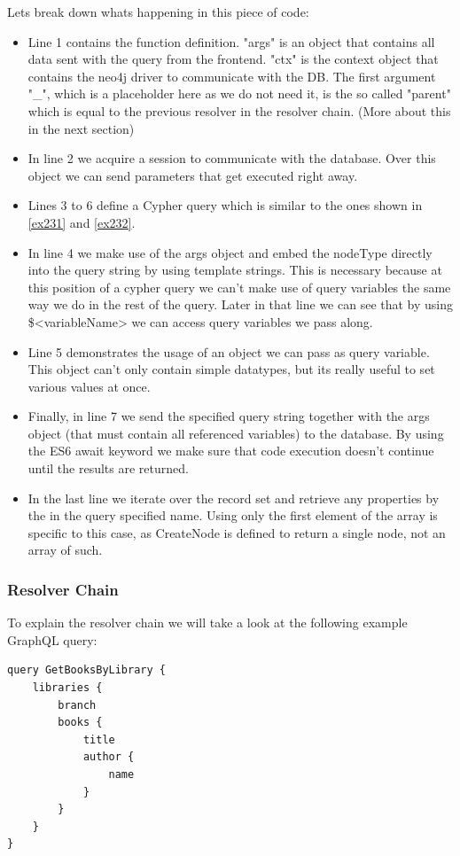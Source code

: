 Lets break down whats happening in this piece of code:
\begin{itemize}
\item Line 1 contains the function definition. "args" is an object that contains all data sent with the query from the frontend. "ctx" is the context object that contains the neo4j driver to communicate with the DB. The first argument "\_", which is a placeholder here as we do not need it, is the so called "parent" which is equal to the previous resolver in the resolver chain. (More about this in the next section)
\item In line 2 we acquire a session to communicate with the database. \cite{Neo4jDriver} Over this object we can send parameters that get executed right away.
\item Lines 3 to 6 define a Cypher query which is similar to the ones shown in \autoref{ex231} and \autoref{ex232}. 
\item In line 4 we make use of the args object and embed the nodeType directly into the query string by using template strings. This is necessary because at this position of a cypher query we can't make use of query variables the same way we do in the rest of the query. Later in that line we can see that by using \$<variableName> we can access query variables we pass along.
\item Line 5 demonstrates the usage of an object we can pass as query variable. This object can't only contain simple datatypes, but its really useful to set various values at once.
\item Finally, in line 7 we send the specified query string together with the args object (that must contain all referenced variables) to the database. By using the ES6 await keyword we make sure that code execution doesn't continue until the results are returned.
\item In the last line we iterate over the record set and retrieve any properties by the in the query specified name. Using only the first element of the array is specific to this case, as CreateNode is defined to return a single node, not an array of such.
\end{itemize}

\subsubsection{Resolver Chain}
To explain the resolver chain we will take a look at the following example GraphQL query: \citep[with adaptions]{ApolloResChain}
\lstset{language=GraphQL}
\begin{lstlisting}[label={ex242},caption={GraphQL query to fetch all books with their title and author name of all libraries}]
query GetBooksByLibrary {
	libraries { 
		branch 
		books { 
			title 
			author { 
				name 
			} 
		} 
	} 
}
\end{lstlisting}

